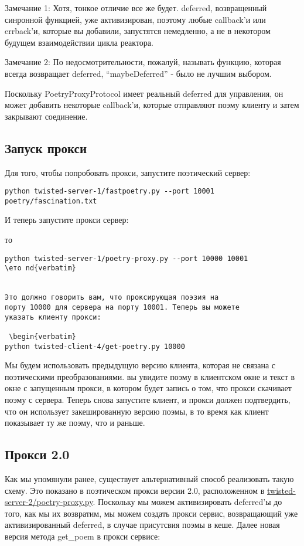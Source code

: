 Замечание 1: Хотя, тонкое отличие все же будет. deferred, возвращенный 
синронной функцией, уже активизирован, поэтому любые callback'и или 
errback'и, которые вы добавили, запустятся немедленно, а не в 
некотором будущем взаимодействии цикла реактора.


Замечание 2: По недосмотрительности, пожалуй, называть функцию, 
которая всегда возвращает deferred, ``maybeDeferred'' - было не 
лучшим выбором.


Поскольку PoetryProxyProtocol имеет реальный deferred для 
управления, он может добавить некоторые callback'и, 
которые отправляют поэму клиенту и затем закрывают 
соединение. 


\subsection{Запуск прокси}

Для того, чтобы попробовать прокси, запустите поэтический сервер:

 \begin{verbatim}
python twisted-server-1/fastpoetry.py --port 10001 poetry/fascination.txt
 \end{verbatim} 

И теперь запустите прокси сервер:

то  \begin{verbatim}
python twisted-server-1/poetry-proxy.py --port 10000 10001
\eто nd{verbatim} 


Это должно говорить вам, что проксирующая поэзия на 
порту 10000 для сервера на порту 10001. Теперь вы можете 
указать клиенту прокси:

 \begin{verbatim}
python twisted-client-4/get-poetry.py 10000
\end{verbatim} 


Мы будем использовать предыдущую версию клиента, 
которая не связана с поэтическими преобразованиями. вы 
увидите поэму в клиентском окне и текст в окне с 
запущенным прокси, в котором будет 
запись о том, что прокси скачивает поэму с сервера. Теперь снова 
запустите клиент, и прокси должен подтвердить, что он использует 
закешированную версию поэмы, в то время как клиент показывает 
ту же поэму, что и раньше. 


\subsection{Прокси 2.0}


Как мы упомянули ранее, существует альтернативный способ 
реализовать такую схему. Это показано в поэтическом прокси 
версии 2.0, расположенном в 
\href{http://github.com/jdavisp3/twisted-intro/blob/master/twisted-server-2/poetry-proxy.py#L1}{twisted-server-2/poetry-proxy.py}. Поскольку мы можем 
активизировать deferred'ы до того, как мы их 
возвратим, мы можем создать прокси сервис, возвращающий 
уже активизированный deferred, в случае присутсвия поэмы в 
кеше. Далее новая версия метода get\_poem в прокси сервисе:

